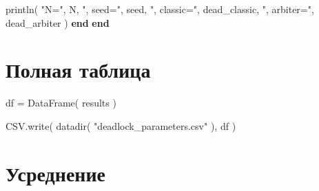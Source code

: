 \documentclass[
  english,
  russian,
  12pt,
  a4paper,
  DIV=11,
  numbers=noendperiod]{scrreprt}
\newenvironment{Shaded}{\begin{snugshade}}{\end{snugshade}}
\newcommand{\ControlFlowTok}[1]{\textcolor[rgb]{0.00,0.23,0.31}{\textbf{#1}}}
\newcommand{\FunctionTok}[1]{\textcolor[rgb]{0.28,0.35,0.67}{#1}}
\newcommand{\NormalTok}[1]{\textcolor[rgb]{0.00,0.23,0.31}{#1}}
\newcommand{\OperatorTok}[1]{\textcolor[rgb]{0.37,0.37,0.37}{#1}}
\newcommand{\StringTok}[1]{\textcolor[rgb]{0.13,0.47,0.30}{#1}}
\begin{document}
\begin{Shaded}
\begin{Highlighting}[]
        \FunctionTok{println}\NormalTok{(}
            \StringTok{"N="}\NormalTok{,}
\NormalTok{            N,}
            \StringTok{", seed="}\NormalTok{,}
\NormalTok{            seed,}
            \StringTok{", classic="}\NormalTok{,}
\NormalTok{            dead\_classic,}
            \StringTok{", arbiter="}\NormalTok{,}
\NormalTok{            dead\_arbiter}
\NormalTok{        )}
    \ControlFlowTok{end}
\ControlFlowTok{end}
\end{Highlighting}
\end{Shaded}

\section{Полная
таблица}\label{ux43fux43eux43bux43dux430ux44f-ux442ux430ux431ux43bux438ux446ux430}

\begin{Shaded}
\begin{Highlighting}[]
\NormalTok{df }\OperatorTok{=}
    \FunctionTok{DataFrame}\NormalTok{(}
\NormalTok{        results}
\NormalTok{    )}

\NormalTok{CSV.}\FunctionTok{write}\NormalTok{(}
    \FunctionTok{datadir}\NormalTok{(}
        \StringTok{"deadlock\_parameters.csv"}
\NormalTok{    ),}
\NormalTok{    df}
\NormalTok{)}
\end{Highlighting}
\end{Shaded}

\section{Усреднение}\label{ux443ux441ux440ux435ux434ux43dux435ux43dux438ux435}
\end{document}
